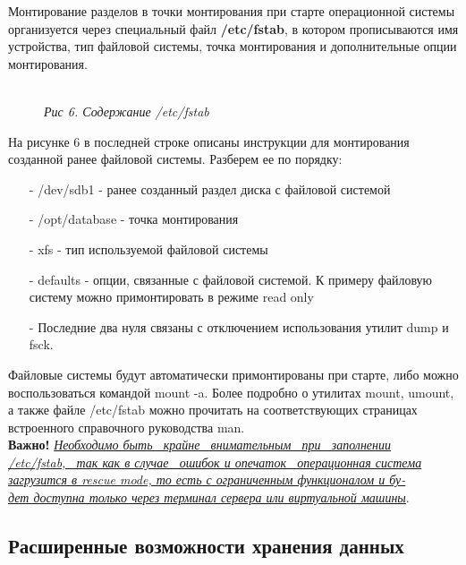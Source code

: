 \documentclass[14pt, a4paper]{article}
\begin{document}
Монтирование разделов в точки монтирования при старте операционной системы организуется через
специальный файл \textbf{/etc/fstab}, в котором прописываются имя устройства, тип файловой системы,
точка монтирования и дополнительные опции монтирования.

\begin{figure}[h]
    \centering
    \\ 
    \small\textit{Рис 6. Содержание /etc/fstab}  
    \label{framework} 
\end{figure}

На рисунке 6 в последней строке описаны инструкции для монтирования созданной ранее файловой
системы. Разберем ее по порядку:

\begin{itemize}
    \item[-] /dev/sdb1 - ранее созданный раздел диска с файловой системой
    \item[-] /opt/database - точка монтирования
    \item[-] xfs - тип используемой файловой системы
    \item[-] defaults - опции, связанные с файловой системой. К примеру файловую систему можно
    примонтировать в режиме read only
    \item[-] Последние два нуля связаны с отключением использования утилит dump и fsck.
\end{itemize}

Файловые системы будут автоматически примонтированы при старте, либо можно воспользоваться
командой \colorbox{backcolour}{mount -a}. Более подробно о утилитах mount, umount, а также файле /etc/fstab можно
прочитать на соответствующих страницах встроенного справочного руководства man.\\

\textbf{Важно!} \underline{\textit{Необходимо  быть \ крайне \ внимательным \ при \ заполнении}}\\ 
\underline{\textit{/etc/fstab, \ так как в случае \ ошибок и опечаток \ операционная система}} \\
\underline{\textit{загрузится в rescue mode, то есть с ограниченным функционалом и бу-}} \\
\underline{\textit{дет доступна только через терминал сервера или виртуальной машины}}.

\newpage

\subsection*{Расширенные возможности хранения данных} 
\end{document}

